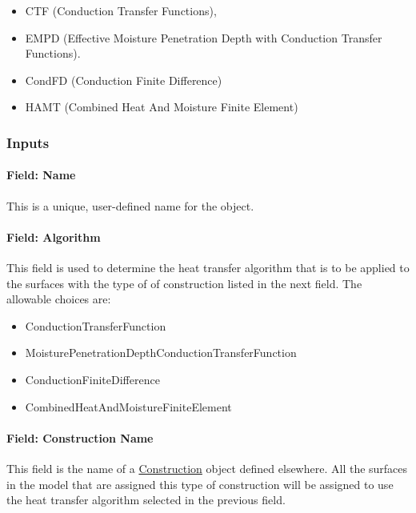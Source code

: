 \begin{itemize}
\item
  CTF (Conduction Transfer Functions),
\item
  EMPD (Effective Moisture Penetration Depth with Conduction Transfer Functions).
\item
  CondFD (Conduction Finite Difference)
\item
  HAMT (Combined Heat And Moisture Finite Element)
\end{itemize}

\subsubsection{Inputs}\label{inputs-3}

\paragraph{Field: Name}\label{field-name-2}

This is a unique, user-defined name for the object.

\paragraph{Field: Algorithm}\label{field-algorithm-3}

This field is used to determine the heat transfer algorithm that is to be applied to the surfaces with the type of of construction listed in the next field. The allowable choices are:

\begin{itemize}
\item
  ConductionTransferFunction
\item
  MoisturePenetrationDepthConductionTransferFunction
\item
  ConductionFiniteDifference
\item
  CombinedHeatAndMoistureFiniteElement
\end{itemize}

\paragraph{Field: Construction Name}\label{field-construction-name}

This field is the name of a \hyperref[construction-000]{Construction} object defined elsewhere. All the surfaces in the model that are assigned this type of construction will be assigned to use the heat transfer algorithm selected in the previous field.

